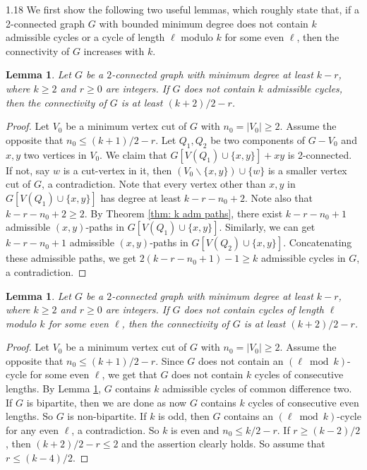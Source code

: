 \documentclass[10pt]{article}
\newtheorem{lemma}[theorem]{Lemma}
\begin{document}
\begin{spacing}{1.18}
    We first show the following two useful lemmas, which roughly state that, if a 2-connected graph $G$ with bounded minimum degree does not contain $k$ admissible cycles or a cycle of length $\ell$ modulo $k$ for some even $\ell$, then the connectivity of $G$ increases with $k$.

\begin{lemma}\label{lemma: high connectivity no k adm cycles}
    Let $G$ be a $2$-connected graph with minimum degree at least $k-r$, where $k\geqslant 2$ and $r\geqslant 0$ are integers. If $G$ does not contain $k$ admissible cycles, then the connectivity of $G$ is at least $(k+2)/2-r$.
\end{lemma}

\begin{proof}
    Let $V_0$ be a minimum vertex cut of $G$ with $n_0=|V_0|\geqslant 2$. Assume the opposite that $n_0\leqslant (k+1)/2-r$. Let $Q_1,Q_2$ be two components of $G-V_0$ and $x,y$ two vertices in $V_0$. We claim that $G[V(Q_1)\cup \{x,y\}]+xy$ is 2-connected. If not, say $w$ is a cut-vertex in it, then $(V_0\backslash \{x,y\})\cup \{w\}$ is a smaller vertex cut of $G$, a contradiction. Note that every vertex other than $x,y$ in $G[V(Q_1)\cup \{x,y\}]$ has degree at least $k-r-n_0+2$. Note also that $k-r-n_0+2\geqslant 2$. By Theorem \ref{thm: k adm paths}, there exist $k-r-n_0+1$ admissible $(x,y)$-paths in $G[V(Q_1)\cup \{x,y\}]$. Similarly, we can get $k-r-n_0+1$ admissible $(x,y)$-paths in $G[V(Q_2)\cup \{x,y\}]$. Concatenating these admissible paths, we get $2(k-r-n_0+1)-1\geqslant k$ admissible cycles in $G$, a contradiction.
\end{proof}


\begin{lemma}\label{lemma: high connectivity no l mod k cycle}
    Let $G$ be a $2$-connected graph with minimum degree at least $k-r$, where $k\geqslant 2$ and $r\geqslant 0$ are integers. If $G$ does not contain cycles of length $\ell$ modulo $k$ for some even $\ell$, then the connectivity of $G$ is at least $(k+2)/2-r$. 
\end{lemma}

\begin{proof}
    Let $V_0$ be a minimum vertex cut of $G$ with $n_0=|V_0|\geqslant 2$. Assume the opposite that $n_0\leqslant (k+1)/2-r$. Since $G$ does not contain an $(\ell\bmod k)$-cycle for some even $\ell$, we get that $G$ does not contain $k$ cycles of consecutive lengths. By Lemma \ref{lemma: high connectivity no k adm cycles}, $G$ contains $k$ admissible cycles of common difference two. If $G$ is bipartite, then we are done as now $G$ contains $k$ cycles of consecutive even lengths. So $G$ is non-bipartite. If $k$ is odd, then $G$ contains an $(\ell\bmod k)$-cycle for any even $\ell$, a contradiction. So $k$ is even and $n_0\leqslant k/2-r$. If $r\geqslant (k-2)/2$, then $(k+2)/2-r\leqslant 2$ and the assertion clearly holds. So assume that $r\leqslant (k-4)/2$. 
    

\end{proof}
\end{spacing}
\end{document}
